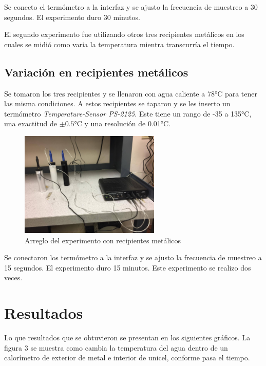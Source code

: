 \documentclass[12pt]{article}
\begin{document}
\hspace*{0.5cm} Se conecto el termómetro a la interfaz y se ajusto la frecuencia de muestreo a 30 segundos. El experimento duro 30 minutos.

El segundo experimento fue utilizando otros tres recipientes metálicos en los cuales  se midió como varia la temperatura mientra transcurría el tiempo.
\vspace{-0.5cm} 
\subsection{Variación en recipientes metálicos}
Se tomaron los tres recipientes y se llenaron con agua caliente a 78°C para tener las misma condiciones. A estos recipientes se taparon y se les inserto un termómetro \textit{Temperature-Sensor PS-2125}. Este tiene un rango de -35 a 135°C, una exactitud de $\pm 0.5$°C y una resolución de 0.01°C. 

\begin{figure}[H]
\centering
\includegraphics[height=5cm]{metal.jpg}
\caption{Arreglo del experimento con recipientes metálicos}
\end{figure}

\hspace*{0.5cm} Se conectaron los termómetro a la interfaz y se ajusto la frecuencia de muestreo a 15 segundos. El experimento duro 15 minutos. Este experimento se realizo dos veces.
\pagebreak

\section{Resultados}
Lo que resultados que se obtuvieron se presentan en los siguientes gráficos. La figura 3 se muestra como cambia la temperatura del agua dentro de un calorímetro de exterior de metal e interior de unicel, conforme pasa el tiempo.
\end{document}
